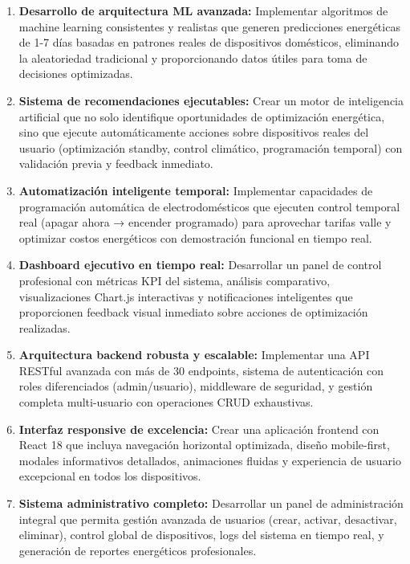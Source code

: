 \begin{enumerate}
    \item \textbf{Desarrollo de arquitectura ML avanzada:} Implementar algoritmos de machine learning consistentes y realistas que generen predicciones energéticas de 1-7 días basadas en patrones reales de dispositivos domésticos, eliminando la aleatoriedad tradicional y proporcionando datos útiles para toma de decisiones optimizadas.
    
    \item \textbf{Sistema de recomendaciones ejecutables:} Crear un motor de inteligencia artificial que no solo identifique oportunidades de optimización energética, sino que ejecute automáticamente acciones sobre dispositivos reales del usuario (optimización standby, control climático, programación temporal) con validación previa y feedback inmediato.
    
    \item \textbf{Automatización inteligente temporal:} Implementar capacidades de programación automática de electrodomésticos que ejecuten control temporal real (apagar ahora → encender programado) para aprovechar tarifas valle y optimizar costos energéticos con demostración funcional en tiempo real.
    
    \item \textbf{Dashboard ejecutivo en tiempo real:} Desarrollar un panel de control profesional con métricas KPI del sistema, análisis comparativo, visualizaciones Chart.js interactivas y notificaciones inteligentes que proporcionen feedback visual inmediato sobre acciones de optimización realizadas.
    
    \item \textbf{Arquitectura backend robusta y escalable:} Implementar una API RESTful avanzada con más de 30 endpoints, sistema de autenticación con roles diferenciados (admin/usuario), middleware de seguridad, y gestión completa multi-usuario con operaciones CRUD exhaustivas.
    
    \item \textbf{Interfaz responsive de excelencia:} Crear una aplicación frontend con React 18 que incluya navegación horizontal optimizada, diseño mobile-first, modales informativos detallados, animaciones fluidas y experiencia de usuario excepcional en todos los dispositivos.
    
    \item \textbf{Sistema administrativo completo:} Desarrollar un panel de administración integral que permita gestión avanzada de usuarios (crear, activar, desactivar, eliminar), control global de dispositivos, logs del sistema en tiempo real, y generación de reportes energéticos profesionales.
    

\end{enumerate}
